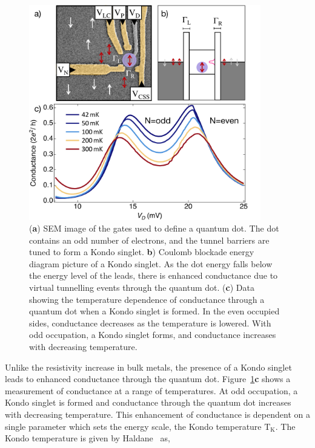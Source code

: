  \begin{figure}[!hbt]
 \begin{center}
\includegraphics[width=0.9\textwidth]{figures/ch2/figure12.pdf}
\caption[Kondo Effect in a Strongly Coupled Quantum Dot]{\label{fig:ch2/kondo_regime_conductance} 
(\textbf{a}) SEM image of the gates used to define a quantum dot. The dot contains an odd number of electrons, and the tunnel barriers are tuned to form a Kondo singlet. \textbf{b}) Coulomb blockade energy diagram picture of a Kondo singlet. As the dot energy falls below the energy level of the leads, there is enhanced conductance due to virtual tunnelling events through the quantum dot. (\textbf{c}) Data showing the temperature dependence of conductance through a quantum dot when a Kondo singlet is formed. In the even occupied sides, conductance decreases as the temperature is lowered. With odd occupation, a Kondo singlet forms, and conductance increases with decreasing temperature.}
 \end{center}
\end{figure}



 Unlike the resistivity increase in bulk metals, the presence of a Kondo singlet leads to enhanced conductance through the quantum dot. Figure~\ref{fig:ch2/kondo_regime_conductance}\textbf{c} shows a measurement of conductance at a range of temperatures. At odd occupation, a Kondo singlet is formed and conductance through the quantum dot increases with decreasing temperature. This enhancement of conductance is dependent on a single parameter which sets the energy scale, the Kondo temperature $\mathrm{T_K}$. The Kondo temperature is given by Haldane~\cite{Haldane1978, kondo_thesis_stuttgart} as,
 

